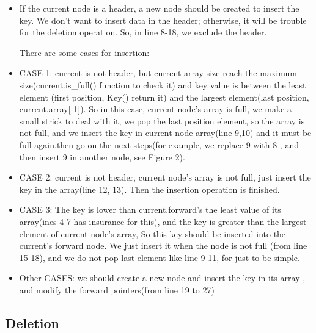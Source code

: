 \documentclass[sigconf, nonacm, letterpaper,top=2cm,bottom=2cm,left=3cm,right=3cm,marginparwidth=1.75cm]{acmart}
\begin{document}
\begin{itemize}


\item  If the current node is a header, a new node should be created to insert the key. We don’t want to insert data in the header; otherwise, it will be trouble for the deletion operation. So, in line 8-18, we exclude the header.
  
There are some cases for insertion:

\item CASE 1: current is not header, but current array size reach the maximum size(current.is\_full() function to check it) and key value is between the least element (first position, Key() return it) and the largest element(last position, current.array[-1]). So in this case, current node’s array is full, we make a small strick to deal with it, we pop the last position element, so the array is not full, and we insert the key in current node array(line 9,10) and it must be full again.then go on the next steps(for example, we replace 9 with 8 , and then insert 9 in another node, see Figure 2).

\item CASE 2: current is not header, current node’s array is not full, just insert the key in the array(line 12, 13). Then the insertion operation is finished.

\item CASE 3: The key is lower than current.forward’s the least value of its array(ines 4-7 has insurance for this), and the key is greater than the largest element of current node’s array, So this key should be inserted into the current’s forward node. We just insert it when the node is not full (from line 15-18), and we do not pop last element like line 9-11, for just to be simple.
\item Other CASES:  we should create a new node and insert the key in its array , and modify the forward pointers(from line 19 to 27)
\end{itemize}

\subsection{Deletion}
\end{document}
